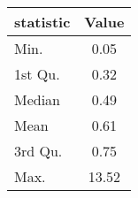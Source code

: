 \begin{tabular}{lc}
  \hline
statistic & Value \\ 
  \hline
Min. & 0.05 \\ 
  1st Qu. & 0.32 \\ 
  Median & 0.49 \\ 
  Mean & 0.61 \\ 
  3rd Qu. & 0.75 \\ 
  Max. & 13.52 \\ 
   \hline
\end{tabular}
